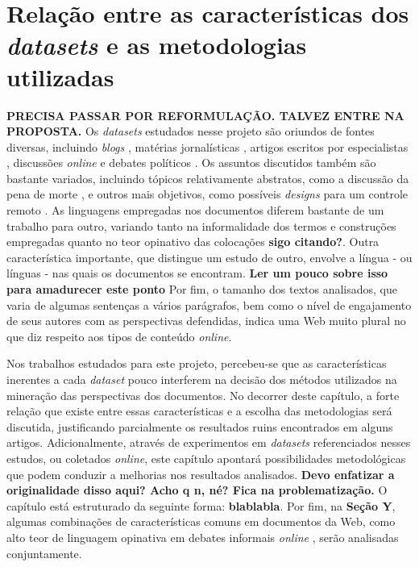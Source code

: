 \chapter{Relação entre as características dos \emph{datasets} e as metodologias utilizadas}
\label{cap:caracsdatasets}

\textbf{PRECISA PASSAR POR REFORMULAÇÃO. TALVEZ ENTRE NA PROPOSTA.}
Os \emph{datasets} estudados nesse projeto são oriundos de fontes diversas, incluindo \emph{blogs} \cite{jiang-argamon} \cite{durant-smith}, matérias jornalísticas \cite{grefenstette-et-al} \cite{schimmelfing-baldwin}, artigos escritos por especialistas \cite{lin-et-al2006} \cite{efrom}, discussões \emph{online} \cite{somasundaran} \cite{wiebe08} e debates políticos \cite{hirst-et-al} \cite{thomas-pang-lee}. Os assuntos discutidos também são bastante variados, incluindo tópicos relativamente abstratos, como a discussão da pena de morte \cite{greeneTESE}, e outros mais objetivos, como possíveis \emph{designs} para um controle remoto \cite{somasundaranGRAPH} \cite{wiebe08}. As linguagens empregadas nos documentos diferem bastante de um trabalho para outro, variando tanto na informalidade dos termos e construções empregadas quanto no teor opinativo das colocações \textbf{sigo citando?}. Outra característica importante, que distingue um estudo de outro, envolve a língua - ou línguas - nas quais os documentos se encontram. \textbf{Ler um pouco sobre isso para amadurecer este ponto} Por fim, o tamanho dos textos analisados, que varia de algumas sentenças a vários parágrafos, bem como o nível de engajamento de seus autores com as perspectivas defendidas, indica uma Web muito plural no que diz respeito aos tipos de conteúdo \emph{online}. 

Nos trabalhos estudados para este projeto, percebeu-se que as características inerentes a cada \emph{dataset} pouco interferem na decisão dos métodos utilizados na mineração das perspectivas dos documentos. No decorrer deste capítulo, a forte relação que existe entre essas características e a escolha das metodologias será discutida, justificando parcialmente os resultados ruins encontrados em alguns artigos. Adicionalmente, através de experimentos em \emph{datasets} referenciados nesses estudos, ou coletados \emph{online}, este capítulo apontará possibilidades metodológicas que podem conduzir a melhorias nos resultados analisados. \textbf{Devo enfatizar a originalidade disso aqui? Acho q n, né? Fica na problematização.} O capítulo está estruturado da seguinte forma: \textbf{blablabla}. Por fim, na \textbf{Seção Y}, algumas combinações de características comuns em documentos da Web, como alto teor de linguagem opinativa em debates informais \emph{online} \cite{somasundaran}, serão analisadas conjuntamente.


